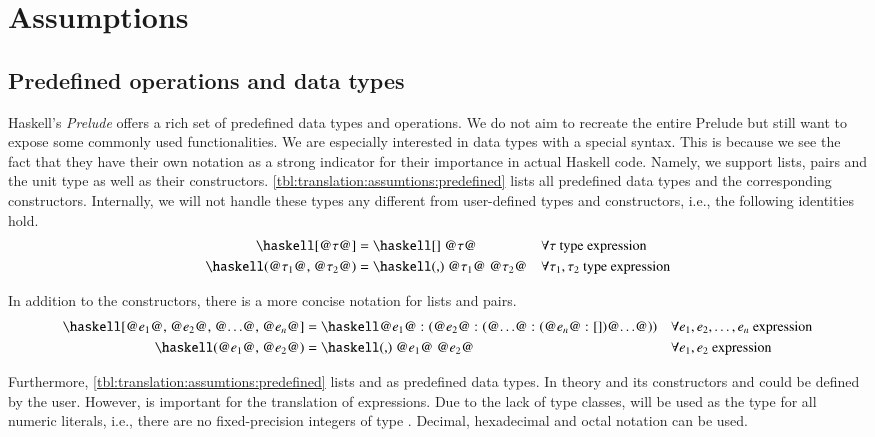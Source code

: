 \section{Assumptions} \label{sec:translation:assumtions}
\subsection{Predefined operations and data types}
Haskell's \textit{Prelude} offers a rich set of predefined data types and operations.
We do not aim to recreate the entire Prelude but still want to expose some commonly used functionalities.
We are especially interested in data types with a special syntax.
This is because we see the fact that they have their own notation as a strong indicator for their importance in actual Haskell code.
Namely, we support lists, pairs and the unit type as well as their constructors.
\autoref{tbl:translation:assumtions:predefined} lists all predefined data types and the corresponding constructors.
Internally, we will not handle these types any different from user-defined types and constructors, i.e., the following identities hold.
\begin{align*}
  \haskellM{[@$\tau$@]}
  &= \haskellM{[] @$\tau$@}
  &&\forall \tau \text{ type expression}
  \\
  \haskellM{(@$\tau_1$@, @$\tau_2$@)}
  &= \haskellM{(,) @$\tau_1$@ @$\tau_2$@}
  &&\forall \tau_1, \tau_2 \text{ type expression}
\end{align*}

In addition to the constructors, there is a more concise notation for lists and pairs.
\begin{align}
  \haskellM{[@$e_1$@, @$e_2$@, @$\ldots$@, @$e_n$@]}
  &= \haskellM{@$e_1$@ : (@$e_2$@ : (@$\ldots$@ : (@$e_n$@ : [])@$\ldots$@))}
  &&\forall e_1, e_2, \ldots, e_n \text{ expression}
  \label{eqn:translation:assumtions:list-literal}
  \\
  \haskellM{(@$e_1$@, @$e_2$@)}
  &= \haskellM{(,) @$e_1$@ @$e_2$@}
  &&\forall e_1, e_2 \text{ expression}
  \label{eqn:translation:assumtions:pair-literal}
\end{align}

Furthermore, \autoref{tbl:translation:assumtions:predefined} lists  and  as predefined data types.
In theory  and its constructors  and  could be defined by the user.
However,  is important for the translation of  expressions.
Due to the lack of type classes,  will be used as the type for all numeric literals, i.e., there are no fixed-precision integers of type .
Decimal, hexadecimal and octal notation can be used.

